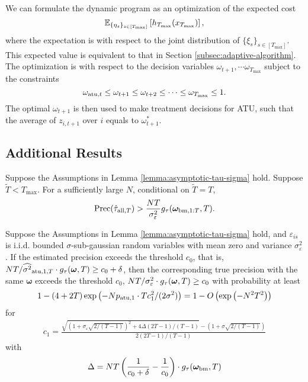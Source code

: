 {We can formulate the dynamic program as an optimization of the expected cost
\[\mathbb{E}_{\{\eta_s\}_{s \in [T_{\max}]}} \left[ h_{T_{\max}}(x_{T_{\max}}) \right], \]
where the expectation is with respect to the joint distribution of $\{\xi_s\}_{s \in [T_{\max}]}$. This expected value is equivalent to that in Section \ref{subsec:adaptive-algorithm}. The optimization is with respect to the decision variables $\omega_{t+1}, \cdots \omega_{T_{\max}}$ subject to the constraints
\[ \omega_{\mathrm{atu},t} \leq  \omega_{t+1} \leq  \omega_{t+2} \leq \cdots \leq \omega_{T_{\max}}  \leq 1. \]
The optimal $\omega_{t+1}$ is then used to make treatment decisions for ATU, such that the average of $z_{i,t+1}$ over $i$ equals to $\omega_{t+1}^\ast$. 
}

\subsection{Additional Results}\label{subsec:sequential-additional-results}

\begin{proposition}\label{prop:precision-ordering}
Suppose the Assumptions in Lemma \ref{lemma:asymptotic-tau-sigma} hold. Suppose $\tilde T < T_{\max}$. For a sufficiently large $N$, conditional on $\tilde T = T$, 
\[\mathrm{Prec}(\hat{\tau}_{\mathrm{all},T}) > \frac{N T}{\sigma^2_{\varepsilon}} g_\tau(\bm{\omega}_{\mathrm{bm},1:T}, T). \]
\end{proposition}

\begin{proposition}\label{prop:precision-guarantee}
    Suppose the Assumptions in Lemma \ref{lemma:asymptotic-tau-sigma} hold, and $\varepsilon_{is}$ is i.i.d. bounded $\sigma$-sub-gaussian random variables with mean zero and variance $\sigma^2_\varepsilon$. If the estimated precision exceeds the threshold $c_0$, that is, $NT/\widehat{\sigma^2}_{\mathrm{atu},1,T} \cdot g_\tau(\bm{\omega}, T) \geq c_0 + \delta$, then the corresponding true precision with the same $\bm{\omega}$ exceeds the threshold $c_0$, $NT/\sigma_\varepsilon^2 \cdot g_\tau(\bm{\omega}, T) \geq c_0 $ with probability at least 
    \begin{align}\label{eqn:precision-probability}
        1 - \left(4 + 2T \right) \exp\left(-N  p_{\mathrm{atu},1} \cdot T c_1^2/(2\sigma^2) \right) = 1 - O\left(  \exp\left(-N^2 T^2 \right) \right)
    \end{align}
    for 
    \begin{align*}
        c_1 = \frac{\sqrt{\left(1+\sigma_\varepsilon \sqrt{2/(T-1)}  \right)^2 + 4 \Delta (2T-1)/(T-1) } -  \left(1+\sigma \sqrt{2/(T-1)}  \right)}{2  (2T-1)/(T-1) }
    \end{align*}
    with 
    \begin{align*}
        \Delta = NT\left(\frac{1}{c_0 + \delta} - \frac{1}{c_0}  \right)\cdot g_\tau(\bm{\omega}_{\mathrm{bm}}, T)
    \end{align*}
\end{proposition}


